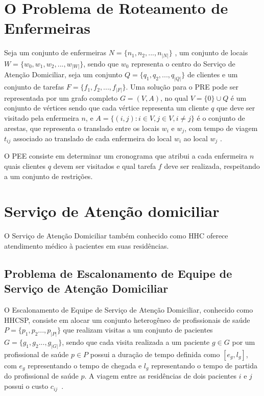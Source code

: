 \section{O Problema de Roteamento de Enfermeiras}

Seja um conjunto de enfermeiras $N = \{n_1, n_2, ..., n_{|N|}\}$ , um conjunto de locais $W = \{w_0, w_1, w_2, ..., w_{|W|}\}$, sendo que $w_0$ representa o centro do Serviço de Atenção Domiciliar, seja um conjunto $Q = \{q_1, q_2, ..., q_{|Q|}\}$ de clientes e um conjunto de tarefas $F = \{ f_1, f_2, ..., f_{|F|}\}$.  
Uma solução para o \ac{PRE} pode ser representada por um grafo completo $G = (V, A)$, no qual $V = \{0\} \cup Q$ é um conjunto de vértices sendo que cada vértice representa um cliente $q$ que deve ser visitado pela enfermeira $n$, e $A = \{ (i,j): i \in V, j \in V, i \neq j \}$ é o conjunto de arestas, que representa o translado entre os locais $w_i$ e $w_j$, com tempo de viagem $t_{ij}$ associado ao translado de cada enfermeira do local $w_i$ ao local $w_j$ \cite{mansini:2016}.

O \ac{PEE} consiste em determinar um cronograma que atribui a cada enfermeira $n$ quais clientes $q$ devem ser visitados e qual tarefa $f$ deve ser realizada, respeitando a um conjunto de restrições\cite{mansini:2016}.

\section{Serviço de Atenção domiciliar}

O Serviço de Atenção Domiciliar também conhecido como \ac{HHC} oferece atendimento médico à pacientes em suas residências. 

\subsection{Problema de Escalonamento de Equipe de Serviço de Atenção Domiciliar}

O Escalonamento de Equipe de Serviço de Atenção Domiciliar, conhecido como \ac{HHCSP}, consiste em alocar um conjunto heterogêneo de profissionais de saúde $P = \{ p_1, p_2 ..., p_{|P|} \}$  que realizam visitas a um conjunto de pacientes  $G = \{ g_1, g_2 ..., g_{|G|} \}$, sendo que cada visita realizada a um paciente $g \in G$ por um profissional de saúde $p \in P$ possui a duração de tempo definida como $[e_{g}, l_{g}]$, com $e_{g}$ representando o tempo de chegada e $l_{g}$ representando o tempo de partida do profissional de saúde $p$. A viagem entre as residências de dois pacientes $i$ e $j$  possui o custo $c_{ij}$~\cite{rasmussenm:2012}.   

